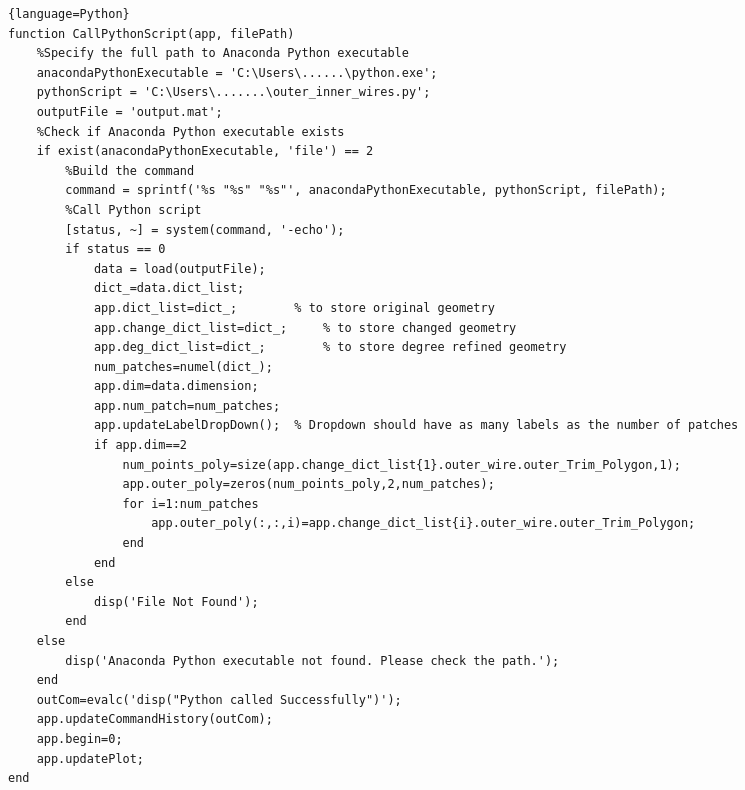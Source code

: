 

\lstset{style=matlab}

\begin{adjustwidth}{-0.5cm}{-0.5cm}
\begin{lstlisting}{language=Python}
function CallPythonScript(app, filePath)
    %Specify the full path to Anaconda Python executable
    anacondaPythonExecutable = 'C:\Users\......\python.exe';
    pythonScript = 'C:\Users\.......\outer_inner_wires.py';
    outputFile = 'output.mat';
    %Check if Anaconda Python executable exists
    if exist(anacondaPythonExecutable, 'file') == 2
        %Build the command
        command = sprintf('%s "%s" "%s"', anacondaPythonExecutable, pythonScript, filePath);
        %Call Python script
        [status, ~] = system(command, '-echo');
        if status == 0
            data = load(outputFile);
            dict_=data.dict_list;
            app.dict_list=dict_;        % to store original geometry
            app.change_dict_list=dict_;     % to store changed geometry
            app.deg_dict_list=dict_;        % to store degree refined geometry
            num_patches=numel(dict_);
            app.dim=data.dimension;
            app.num_patch=num_patches;
            app.updateLabelDropDown();  % Dropdown should have as many labels as the number of patches
            if app.dim==2
                num_points_poly=size(app.change_dict_list{1}.outer_wire.outer_Trim_Polygon,1);
                app.outer_poly=zeros(num_points_poly,2,num_patches);
                for i=1:num_patches
                    app.outer_poly(:,:,i)=app.change_dict_list{i}.outer_wire.outer_Trim_Polygon;
                end
            end
        else
            disp('File Not Found');
        end
    else
        disp('Anaconda Python executable not found. Please check the path.');
    end
    outCom=evalc('disp("Python called Successfully")');
    app.updateCommandHistory(outCom);
    app.begin=0;
    app.updatePlot;
end

\end{lstlisting}
\end{adjustwidth}
